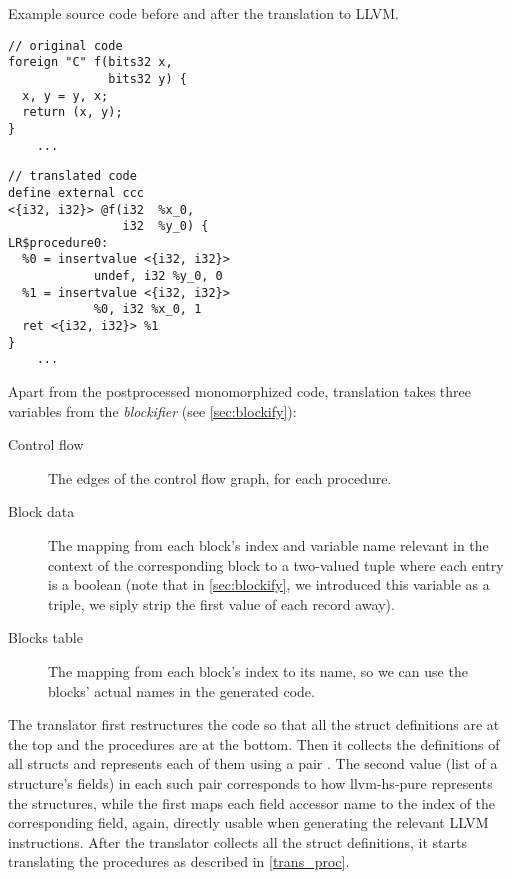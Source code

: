 \begin{listing}
    \caption{Example source code before and after the translation to LLVM.}
    \label{lst:transl}
    \begin{center}
    \begin{minipage}{0.5\linewidth}
    \begin{lstlisting}
// original code
foreign "C" f(bits32 x,
              bits32 y) {
  x, y = y, x;
  return (x, y);
}
    ...\end{lstlisting}
    \end{minipage}%
    \begin{minipage}{0.5\linewidth}
    \begin{lstlisting}
// translated code
define external ccc
<{i32, i32}> @f(i32  %x_0,
                i32  %y_0) {
LR$procedure0:
  %0 = insertvalue <{i32, i32}>
            undef, i32 %y_0, 0
  %1 = insertvalue <{i32, i32}>
            %0, i32 %x_0, 1
  ret <{i32, i32}> %1
}
    ...\end{lstlisting}
    \end{minipage}
    \end{center}
\end{listing}

Apart from the postprocessed monomorphized code, translation takes three variables from the \emph{blockifier} (see \cref{sec:blockify}):

\begin{description}
    \item[Control flow] The edges of the control flow graph, for each procedure.
    \item[Block data] The mapping from each block's index and variable name relevant in the context of the corresponding block to a two-valued tuple \linebreak {} where each entry is a boolean (note that in \cref{sec:blockify}, we introduced this variable as a triple, we siply strip the first value of each record away).
    \item[Blocks table] The mapping from each block's index to its name, so we can use the blocks' actual names in the generated code.
\end{description}

The translator first restructures the code so that all the struct definitions are at the top and the procedures are at the bottom. Then it collects the definitions of all structs and represents each of them using a pair  . The second value (list of a structure's fields) in each such pair corresponds to how llvm-hs-pure represents the structures, while the first maps each field accessor name to the index of the corresponding field, again, directly usable when generating the relevant LLVM instructions. After the translator collects all the struct definitions, it starts translating the procedures as described in \cref{trans_proc}.

